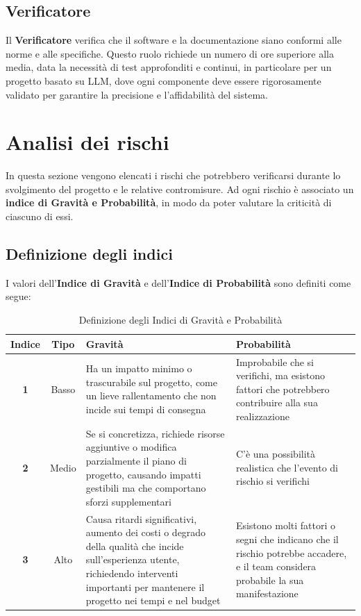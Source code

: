 \documentclass{article}
\begin{document}
\subsection{Verificatore}
Il \textbf{Verificatore} verifica che il software e la documentazione siano conformi alle norme e alle specifiche. Questo ruolo richiede un numero di ore superiore alla media, data la necessità di test approfonditi e continui, in particolare per un progetto basato su LLM, dove ogni componente deve essere rigorosamente validato per garantire la precisione e l’affidabilità del sistema.


\newpage
\section{Analisi dei rischi}
In questa sezione vengono elencati i rischi che potrebbero verificarsi durante lo svolgimento del progetto e le relative contromisure. Ad ogni rischio è associato un \textbf{indice di Gravità e Probabilità},
in modo da poter valutare la criticità di ciascuno di essi.
\subsection{Definizione degli indici}
I valori dell'\textbf{Indice di Gravità} e dell'\textbf{Indice di Probabilità} sono definiti come segue:
\begin{table}[h!]
    \centering
    \begin{tabular}{|c|c|p{6cm}|p{6cm}|}
        \hline
        \textbf{Indice} & \textbf{Tipo} & \textbf{Gravità} & \textbf{Probabilità} \\
        \hline
        \textbf{1} & Basso & Ha un impatto minimo o trascurabile sul progetto, come un lieve rallentamento che non incide sui tempi di consegna & Improbabile che si verifichi, ma esistono fattori che potrebbero contribuire alla sua realizzazione \\
        \hline
        \textbf{2} & Medio & Se si concretizza, richiede risorse aggiuntive o modifica parzialmente il piano di progetto, causando impatti gestibili ma che comportano sforzi supplementari & C'è una possibilità realistica che l'evento di rischio si verifichi \\
        \hline
        \textbf{3} & Alto & Causa ritardi significativi, aumento dei costi o degrado della qualità che incide sull’esperienza utente, richiedendo interventi importanti per mantenere il progetto nei tempi e nel budget & Esistono molti fattori o segni che indicano che il rischio potrebbe accadere, e il team considera probabile la sua manifestazione \\
        \hline
    \end{tabular}
    \caption{Definizione degli Indici di Gravità e Probabilità}
    \label{tab:definizione_indici}
\end{table}
    
\end{document}
